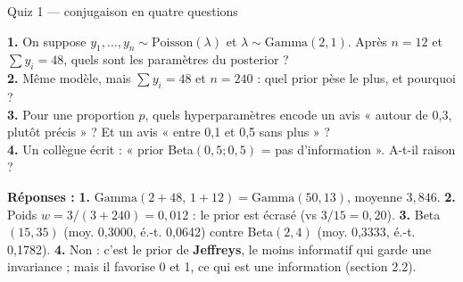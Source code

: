 \begin{frame}{Quiz 1 — conjugaison en quatre questions}
\begin{qbox}
\textbf{1.} On suppose $y_1,\dots,y_n \sim \mathrm{Poisson}(\lambda)$ et
$\lambda \sim \mathrm{Gamma}(2, 1)$. Après $n = 12$ et $\sum y_i = 48$,
quels sont les paramètres du posterior ? \\[1mm]
\textbf{2.} Même modèle, mais $\sum y_i = 48$ et $n = 240$ : quel prior pèse
le plus, et pourquoi ? \\[1mm]
\textbf{3.} Pour une proportion $p$, quels hyperparamètres encode un avis « autour
de 0,3, plutôt précis » ? Et un avis « entre 0,1 et 0,5 sans plus » ? \\[1mm]
\textbf{4.} Un collègue écrit : « prior Beta$(0{,}5;0{,}5)$ = pas d'information ».
A-t-il raison ?
\vspace{2mm}

\textcolor{byBlue}{\textbf{Réponses :}}
\textbf{1.} $\mathrm{Gamma}(2+48,\,1+12) = \mathrm{Gamma}(50,13)$, moyenne
$3{,}846$. \quad
\textbf{2.} Poids $w = 3/(3+240) = 0{,}012$ : le prior est écrasé (vs $3/15 = 0{,}20$). \quad
\textbf{3.} Beta$(15,35)$ (moy. 0,3000, é.-t. 0,0642) contre Beta$(2,4)$ (moy. 0,3333, é.-t. 0,1782). \quad
\textbf{4.} Non : c'est le prior de \textbf{Jeffreys}, le moins informatif qui garde
une invariance ; mais il favorise 0 et 1, ce qui est une information (section 2.2).
\end{qbox}
\end{frame}


